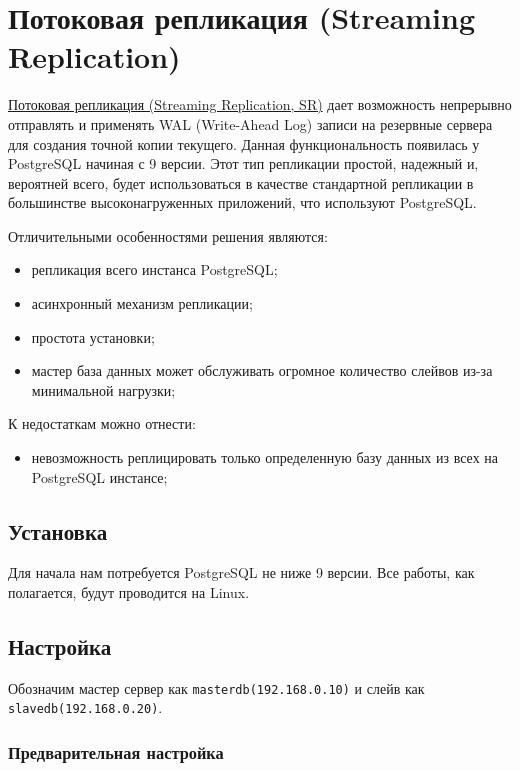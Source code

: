 \section{Потоковая репликация (Streaming Replication)}

\href{https://wiki.postgresql.org/wiki/Streaming_Replication}{Потоковая репликация (Streaming Replication, SR)} дает возможность непрерывно отправлять и применять WAL (Write-Ahead Log) записи на резервные сервера для создания точной копии текущего. Данная функциональность появилась у PostgreSQL начиная с 9 версии. Этот тип репликации простой, надежный и, вероятней всего, будет использоваться в качестве стандартной репликации в большинстве высоконагруженных приложений, что используют PostgreSQL.

Отличительными особенностями решения являются:

\begin{itemize}
  \item репликация всего инстанса PostgreSQL;
  \item асинхронный механизм репликации;
  \item простота установки;
  \item мастер база данных может обслуживать огромное количество слейвов из-за минимальной нагрузки;
\end{itemize}

К недостаткам можно отнести:

\begin{itemize}
  \item невозможность реплицировать только определенную базу данных из всех на PostgreSQL инстансе;
\end{itemize}

\subsection{Установка}

Для начала нам потребуется PostgreSQL не ниже 9 версии. Все работы, как полагается, будут проводится на Linux.

\subsection{Настройка}

Обозначим мастер сервер как \lstinline!masterdb(192.168.0.10)! и слейв как \lstinline!slavedb(192.168.0.20)!.

\subsubsection{Предварительная настройка}

